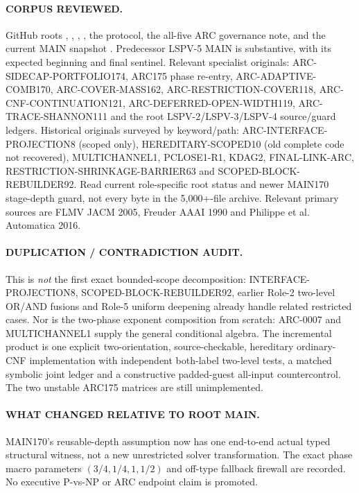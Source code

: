 \documentclass[11pt]{article}
\begin{document}
\paragraph{CORPUS REVIEWED.}
GitHub roots , ,
, , the
protocol, the all-five ARC governance note,
and the current MAIN snapshot
.
Predecessor LSPV-5 MAIN is substantive,
with its expected beginning and final sentinel.
Relevant specialist originals:
ARC-SIDECAP-PORTFOLIO174, ARC175 phase re-entry,
ARC-ADAPTIVE-COMB170, ARC-COVER-MASS162,
ARC-RESTRICTION-COVER118,
ARC-CNF-CONTINUATION121,
ARC-DEFERRED-OPEN-WIDTH119,
ARC-TRACE-SHANNON111 and the root
LSPV-2/LSPV-3/LSPV-4 source/guard ledgers.
Historical originals surveyed by keyword/path:
ARC-INTERFACE-PROJECTION8 (scoped only),
HEREDITARY-SCOPED10 (old complete code
not recovered), MULTICHANNEL1, PCLOSE1-R1,
KDAG2, FINAL-LINK-ARC,
RESTRICTION-SHRINKAGE-BARRIER63 and
SCOPED-BLOCK-REBUILDER92. Read current
role-specific root status and newer
MAIN170 stage-depth guard, not every byte
in the 5,000+-file archive. Relevant
primary sources are FLMV JACM 2005,
Freuder AAAI 1990 and Philippe et al.
Automatica 2016.

\paragraph{DUPLICATION / CONTRADICTION AUDIT.}
This is \emph{not} the first exact
bounded-scope decomposition: INTERFACE-PROJECTION8,
SCOPED-BLOCK-REBUILDER92, earlier
Role-2 two-level OR/AND fusions and
Role-5 uniform deepening already
handle related restricted cases.
Nor is the two-phase exponent
composition from scratch: ARC-0007
and MULTICHANNEL1 supply the general
conditional algebra. The incremental
product is one explicit two-orientation,
source-checkable, hereditary ordinary-CNF
implementation with independent both-label
two-level tests, a matched symbolic joint
ledger and a constructive padded-guest
all-input countercontrol. The two unstable
ARC175 matrices are still unimplemented.

\paragraph{WHAT CHANGED RELATIVE TO ROOT MAIN.}
MAIN170's reusable-depth assumption
now has one end-to-end actual
typed structural witness,
not a new unrestricted solver
transformation. The exact phase macro
parameters $(3/4,1/4,1,1/2)$
and off-type fallback firewall
are recorded. No executive
P-vs-NP or ARC endpoint claim is promoted.
\end{document}
